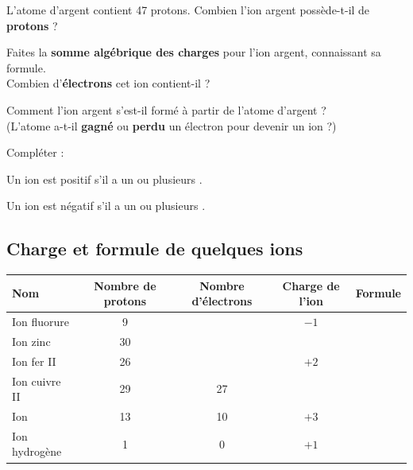 \documentclass[a4paper,12pt]{article}
\begin{document}
\begin{compactitem}
  \item L’atome d’argent contient 47 protons. Combien l’ion argent possède-t-il de \textbf{protons} ?
  \item Faites la \textbf{somme algébrique des charges} pour l’ion argent, connaissant sa formule.\\
  Combien d’\textbf{électrons} cet ion contient-il ?
  \item Comment l’ion argent s’est-il formé à partir de l’atome d’argent ?\\
  (L’atome a-t-il \textbf{gagné} ou \textbf{perdu} un électron pour devenir un ion ?)
  \item Compléter :
  \begin{compactitem}
    \item Un ion est positif s’il a \dotfill un ou plusieurs \dotfill .
    \item Un ion est négatif s’il a \dotfill un ou plusieurs \dotfill .
  \end{compactitem}
\end{compactitem}

\subsection{Charge et formule de quelques ions}

\renewcommand{\arraystretch}{2.0} %
\begin{center}
\begin{tabular}{|l|c|c|c|c|}
\hline
\textbf{Nom} & \textbf{Nombre de protons} & \textbf{Nombre d’électrons} & \textbf{Charge de l’ion} & \textbf{Formule} \\
\hline
Ion fluorure & 9 & \hspace{2em} & $-1$ & \hspace{3em} \\
\hline
Ion zinc & 30 & \hspace{2em} & \hspace{2em} & \hspace{3em} \\
\hline
Ion fer II & 26 & \hspace{2em} & $+2$ & \hspace{3em} \\
\hline
Ion cuivre II & 29 & 27 & \hspace{2em} & \hspace{3em} \\
\hline
Ion \hspace{2em} & 13 & 10 & $+3$ & \hspace{3em} \\
\hline
Ion hydrogène & 1 & 0 & $+1$ & \hspace{3em} \\
\hline
\end{tabular}
\end{center}
\end{document}
